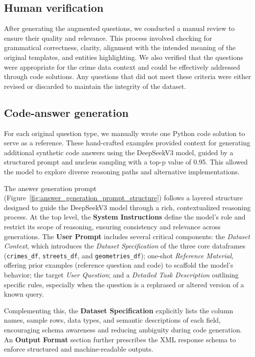 \subsection{Human verification}

After generating the augmented questions, we conducted a manual review to ensure their quality and relevance. This process involved checking for grammatical correctness, clarity, alignment with the intended meaning of the original templates, and entities highlighting. We also verified that the questions were appropriate for the crime data context and could be effectively addressed through code solutions. Any questions that did not meet these criteria were either revised or discarded to maintain the integrity of the dataset.


\subsection{Code-answer generation}

For each original question type, we manually wrote one Python code solution to serve as a reference. These hand-crafted examples provided context for generating additional synthetic code answers using the DeepSeekV3 model, guided by a structured prompt and nucleus sampling \citep{Holtzman2020NucleusSampling, Ahmad2025OCRNVidia, Nvidia2024KaggleMath} with a top-p value of 0.95. This allowed the model to explore diverse reasoning paths and alternative implementations.

The answer generation prompt (Figure~\ref{fig:answer_generation_prompt_structure}) follows a layered structure designed to guide the DeepSeekV3 model through a rich, contextualized reasoning process. At the top level, the \textbf{System Instructions} define the model’s role and restrict its scope of reasoning, ensuring consistency and relevance across generations. The \textbf{User Prompt} includes several critical components: the \textit{Dataset Context}, which introduces the \textit{Dataset Specification} of the three core dataframes (\texttt{crimes\_df}, \texttt{streets\_df}, and \texttt{geometries\_df}); one-shot \textit{Reference Material}, offering prior examples (reference question and code) to scaffold the model’s behavior; the target \textit{User Question}; and a \textit{Detailed Task Description} outlining specific rules, especially when the question is a rephrased or altered version of a known query.

Complementing this, the \textbf{Dataset Specification} explicitly lists the column names, sample rows, data types, and semantic descriptions of each field, encouraging schema awareness and reducing ambiguity during code generation. An \textbf{Output Format} section further prescribes the XML response schema to enforce structured and machine-readable outputs.

